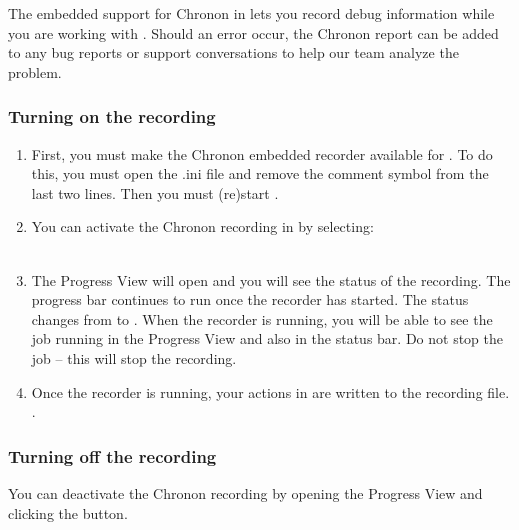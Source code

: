 
The embedded support for Chronon in \app{} lets you record debug information while you are working with \app{}. Should an error occur, the Chronon report can be added to any bug reports or support conversations to help our team analyze the problem. 

\subsubsection{Turning on the recording}
\begin{enumerate}
\item First, you must make the Chronon embedded recorder available for \app{}. To do this, you must open the \app{}.ini file and remove the comment symbol from the last two lines. Then you must (re)start \app{}. 
\item You can activate the Chronon recording in \app{} by selecting:\\
\\
\item The Progress View will open and you will see the status of the recording. The progress bar continues to run once the recorder has started. The status changes from  to . When the recorder is running, you will be able to see the job running in the Progress View and also in the status bar. Do not stop the job -- this will stop the recording. 
\item Once the recorder is running, your actions in \app{} are written to the recording file.
. 
\end{enumerate}

 
\subsubsection{Turning off the recording}
You can deactivate the Chronon recording by opening the Progress View and clicking the  button. 

